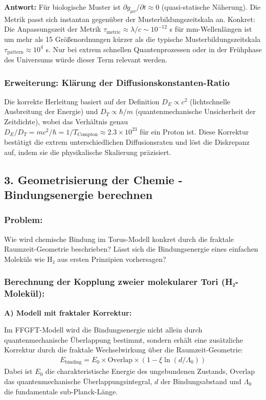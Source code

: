 \documentclass[12pt,a4paper]{article}
\begin{document}
	\textbf{Antwort:} Für biologische Muster ist $\partial g_{\mu\nu}/\partial t \approx 0$ (quasi-statische Näherung). Die Metrik passt sich instantan gegenüber der Musterbildungszeitskala an. Konkret: Die Anpassungszeit der Metrik $\tau_{\text{metric}} \approx \lambda/c \sim 10^{-12}$ s für mm-Wellenlängen ist um mehr als 15 Größenordnungen kürzer als die typische Musterbildungszeitskala $\tau_{\text{pattern}} \approx 10^4$ s. Nur bei extrem schnellen Quantenprozessen oder in der Frühphase des Universums würde dieser Term relevant werden.
	
	\subsubsection*{Erweiterung: Klärung der Diffusionskonstanten-Ratio}
	Die korrekte Herleitung basiert auf der Definition $D_E \propto c^2$ (lichtschnelle Ausbreitung der Energie) und $D_T \propto \hbar / m$ (quantenmechanische Unsicherheit der Zeitdichte), wobei das Verhältnis genau $D_E / D_T = m c^2 / \hbar = 1 / T_{\text{Compton}} \approx 2.3 \times 10^{23}$ für ein Proton ist. Diese Korrektur bestätigt die extrem unterschiedlichen Diffusionsraten und löst die Diskrepanz auf, indem sie die physikalische Skalierung präzisiert.
	
	\subsection*{3. Geometrisierung der Chemie - Bindungsenergie berechnen}
	
	\subsubsection*{Problem:}
	Wie wird chemische Bindung im Torus-Modell konkret durch die fraktale Raumzeit-Geometrie beschrieben? Lässt sich die Bindungsenergie eines einfachen Moleküls wie H₂ aus ersten Prinzipien vorhersagen?
	
	\subsubsection*{Berechnung der Kopplung zweier molekularer Tori (H₂-Molekül):}
	
	\textbf{A) Modell mit fraktaler Korrektur:}
	
	Im FFGFT-Modell wird die Bindungsenergie nicht allein durch quantenmechanische Überlappung bestimmt, sondern erhält eine zusätzliche Korrektur durch die fraktale Wechselwirkung über die Raumzeit-Geometrie:
	\begin{align*}
		E_{\text{binding}} = E_0 \times \text{Overlap} \times \left(1 - \xi \ln(d/\Lambda_0)\right)
	\end{align*}
	Dabei ist $E_0$ die charakteristische Energie des ungebundenen Zustands, $\text{Overlap}$ das quantenmechanische Überlappungsintegral, $d$ der Bindungsabstand und $\Lambda_0$ die fundamentale sub-Planck-Länge.
	
\end{document}
